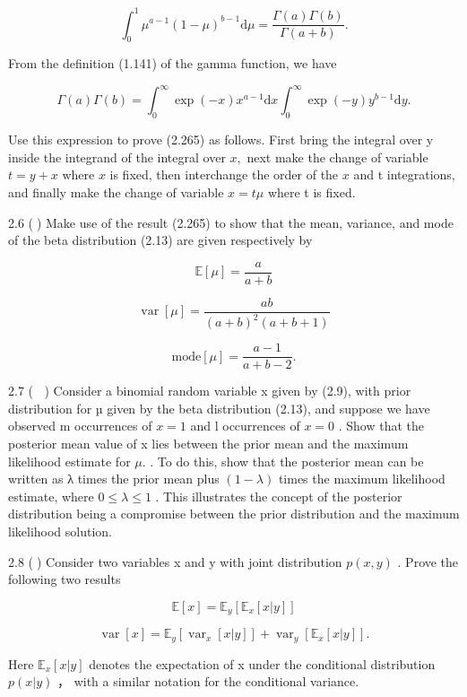 \documentclass[
  10
]{article}
\begin{document}
\[
\int_ {0} ^ {1} \mu^ {a - 1} (1 - \mu) ^ {b - 1} \mathrm{d} \mu = \frac {\Gamma (a) \Gamma (b)}{\Gamma (a + b)}.\tag{2.265}
\]

From the definition (1.141) of the gamma function, we have

\[
\Gamma (a) \Gamma (b) = \int_ {0} ^ {\infty} \exp (- x) x ^ {a - 1} \mathrm{d} x \int_ {0} ^ {\infty} \exp (- y) y ^ {b - 1} \mathrm{d} y.\tag{2.266}
\]

Use this expression to prove (2.265) as follows. First bring the
integral over y inside the integrand of the integral over \(x ,\) next
make the change of variable \(t = y + x\) where \(x\) is fixed, then
interchange the order of the \(x\) and t integrations, and finally make
the change of variable \(x = t \mu\) where t is fixed.

2.6 () Make use of the result (2.265) to show that the mean, variance,
and mode of the beta distribution (2.13) are given respectively by

\[
\mathbb {E} [ \mu ] = \frac {a}{a + b}\tag{2.267}
\]

\[
\operatorname{var} [ \mu ] = \frac {a b}{(a + b) ^ {2} (a + b + 1)}\tag{2.268}
\]

\[
\mathrm{mode} [ \mu ] = \frac {a - 1}{a + b - 2}.\tag{2.269}
\]

2.7 ( ) Consider a binomial random variable x given by (2.9), with prior
distribution for µ given by the beta distribution (2.13), and suppose we
have observed m occurrences of \(x = 1\) and l occurrences of \(x = 0\)
. Show that the posterior mean value of x lies between the prior mean
and the maximum likelihood estimate for \(\mu .\) . To do this, show
that the posterior mean can be written as λ times the prior mean plus
\(( 1 - \lambda )\) times the maximum likelihood estimate, where
\(0 \leqslant \lambda \leqslant 1\) . This illustrates the concept of
the posterior distribution being a compromise between the prior
distribution and the maximum likelihood solution.

2.8 () Consider two variables x and y with joint distribution
\(p ( x , y )\) . Prove the following two results

\[
{\mathbb {E} [ x ]} = {\mathbb {E} _ {y} \left[ \mathbb {E} _ {x} [ x | y ] \right]}\tag{2.270}
\]

\[
\operatorname{var} [ x ] = \mathbb {E} _ {y} \left[ \operatorname{var} _ {x} [ x | y ] \right] + \operatorname{var} _ {y} \left[ \mathbb {E} _ {x} [ x | y ] \right].\tag{2.271}
\]

Here \(\mathbb { E } _ { x } [ x | y ]\) denotes the expectation of x
under the conditional distribution \(p ( x | y )\) ， with a similar
notation for the conditional variance.
\end{document}
